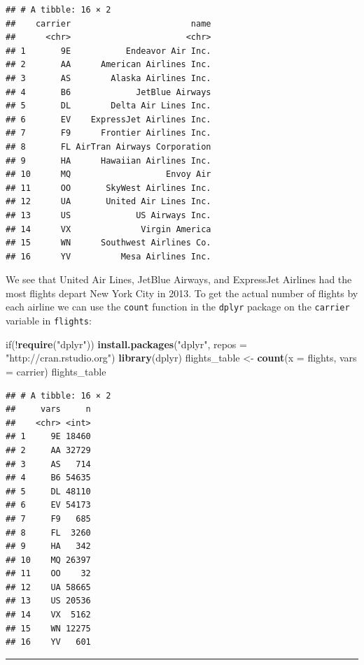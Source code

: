 \documentclass[]{tufte-book}
\newenvironment{Shaded}{\begin{snugshade}}{\end{snugshade}}
\newcommand{\KeywordTok}[1]{\textcolor[rgb]{0.13,0.29,0.53}{\textbf{{#1}}}}
\newcommand{\DataTypeTok}[1]{\textcolor[rgb]{0.13,0.29,0.53}{{#1}}}
\newcommand{\StringTok}[1]{\textcolor[rgb]{0.31,0.60,0.02}{{#1}}}
\newcommand{\NormalTok}[1]{{#1}}
\let\oldrule=\rule
\renewcommand{\rule}[1]{\oldrule{\linewidth}}
\begin{document}
\begin{verbatim}
## # A tibble: 16 × 2
##    carrier                        name
##      <chr>                       <chr>
## 1       9E           Endeavor Air Inc.
## 2       AA      American Airlines Inc.
## 3       AS        Alaska Airlines Inc.
## 4       B6             JetBlue Airways
## 5       DL        Delta Air Lines Inc.
## 6       EV    ExpressJet Airlines Inc.
## 7       F9      Frontier Airlines Inc.
## 8       FL AirTran Airways Corporation
## 9       HA      Hawaiian Airlines Inc.
## 10      MQ                   Envoy Air
## 11      OO       SkyWest Airlines Inc.
## 12      UA       United Air Lines Inc.
## 13      US             US Airways Inc.
## 14      VX              Virgin America
## 15      WN      Southwest Airlines Co.
## 16      YV          Mesa Airlines Inc.
\end{verbatim}

We see that United Air Lines, JetBlue Airways, and ExpressJet Airlines
had the most flights depart New York City in 2013. To get the actual
number of flights by each airline we can use the \texttt{count} function
in the \texttt{dplyr} package on the \texttt{carrier} variable in
\texttt{flights}:

\begin{Shaded}
\begin{Highlighting}[]
\NormalTok{if(!}\KeywordTok{require}\NormalTok{(}\StringTok{"dplyr"}\NormalTok{))}
  \KeywordTok{install.packages}\NormalTok{(}\StringTok{"dplyr"}\NormalTok{, }\DataTypeTok{repos =} \StringTok{"http://cran.rstudio.org"}\NormalTok{)}
\KeywordTok{library}\NormalTok{(dplyr)}
\NormalTok{flights_table <-}\StringTok{ }\KeywordTok{count}\NormalTok{(}\DataTypeTok{x =} \NormalTok{flights, }\DataTypeTok{vars =} \NormalTok{carrier)}
\NormalTok{flights_table}
\end{Highlighting}
\end{Shaded}

\begin{verbatim}
## # A tibble: 16 × 2
##     vars     n
##    <chr> <int>
## 1     9E 18460
## 2     AA 32729
## 3     AS   714
## 4     B6 54635
## 5     DL 48110
## 6     EV 54173
## 7     F9   685
## 8     FL  3260
## 9     HA   342
## 10    MQ 26397
## 11    OO    32
## 12    UA 58665
## 13    US 20536
## 14    VX  5162
## 15    WN 12275
## 16    YV   601
\end{verbatim}

\begin{center}\rule{0.5\linewidth}{\linethickness}\end{center}
\end{document}
